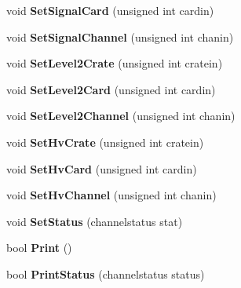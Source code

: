 \begin{DoxyCompactItemize}
\item 
\hypertarget{classChannel_aaa842caa030e691f361bbb38b60c19ac}{void {\bfseries Set\-Signal\-Card} (unsigned int cardin)}\label{classChannel_aaa842caa030e691f361bbb38b60c19ac}

\item 
\hypertarget{classChannel_acd431f017fca170ea3036f96b0f79e9f}{void {\bfseries Set\-Signal\-Channel} (unsigned int chanin)}\label{classChannel_acd431f017fca170ea3036f96b0f79e9f}

\item 
\hypertarget{classChannel_a82c97b5b03f81dc4c415f9e6ff4e5cd7}{void {\bfseries Set\-Level2\-Crate} (unsigned int cratein)}\label{classChannel_a82c97b5b03f81dc4c415f9e6ff4e5cd7}

\item 
\hypertarget{classChannel_a7144068a386f201f596bb389a09c2806}{void {\bfseries Set\-Level2\-Card} (unsigned int cardin)}\label{classChannel_a7144068a386f201f596bb389a09c2806}

\item 
\hypertarget{classChannel_ab6fbf3a0ad9f0a81f57e78b4d0030b1b}{void {\bfseries Set\-Level2\-Channel} (unsigned int chanin)}\label{classChannel_ab6fbf3a0ad9f0a81f57e78b4d0030b1b}

\item 
\hypertarget{classChannel_a0fa53863af75dc3113462587216eb72f}{void {\bfseries Set\-Hv\-Crate} (unsigned int cratein)}\label{classChannel_a0fa53863af75dc3113462587216eb72f}

\item 
\hypertarget{classChannel_a6d80a27a7baf8c35f107794f3907cd8f}{void {\bfseries Set\-Hv\-Card} (unsigned int cardin)}\label{classChannel_a6d80a27a7baf8c35f107794f3907cd8f}

\item 
\hypertarget{classChannel_ab710af8a4a2334b2fecb7908ef14f18b}{void {\bfseries Set\-Hv\-Channel} (unsigned int chanin)}\label{classChannel_ab710af8a4a2334b2fecb7908ef14f18b}

\item 
\hypertarget{classChannel_af036686e0a7cecce9996e28cf7f2067f}{void {\bfseries Set\-Status} (channelstatus stat)}\label{classChannel_af036686e0a7cecce9996e28cf7f2067f}

\item 
\hypertarget{classChannel_a8361bdcaf6dfafc874f6a612dcded25a}{bool {\bfseries Print} ()}\label{classChannel_a8361bdcaf6dfafc874f6a612dcded25a}

\item 
\hypertarget{classChannel_ad5ceba06c660386cafaf7801f6adbfad}{bool {\bfseries Print\-Status} (channelstatus status)}\label{classChannel_ad5ceba06c660386cafaf7801f6adbfad}

\end{DoxyCompactItemize}
